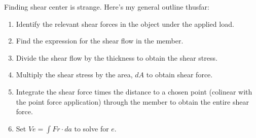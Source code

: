 \documentclass{article}
\begin{document}
\pagebreak


Finding shear center is strange. Here's my general outline thusfar:
\begin{enumerate}
    \item Identify the relevant shear forces in the object under the applied load.
    \item Find the expression for the shear flow in the member.
    \item Divide the shear flow by the thickness to obtain the shear stress.
    \item Multiply the shear stress by the area, $dA$ to obtain shear force.
    \item Integrate the shear force times the distance to a chosen point (colinear with the point force application) 
    through the member to obtain the entire shear force. 
    \item Set $Ve = \int Fr\cdot da$ to solve for $e$.
\end{enumerate}
\end{document}
